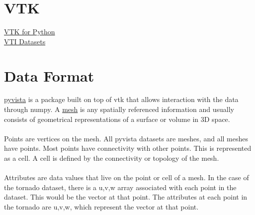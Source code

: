 \documentclass{article}
\begin{document}
\section*{VTK}
\href{https://kitware.github.io/vtk-examples/site/Python/}{VTK for Python}\\
\href{https://cgl.ethz.ch/research/visualization/data.php}{VTI Datasets}


\section*{Data Format}
\href{https://docs.pyvista.org/index.html}{pyvista} is a package built on top of vtk that allows interaction with the data through numpy. A \href{https://docs.pyvista.org/user-guide/what-is-a-mesh.html}{mesh} is any spatially referenced information and usually consists of geometrical representations of a surface or volume in 3D space.
\\\\
Points are vertices on the mesh. All pyvista datasets are meshes, and all meshes have points. Most points have connectivity with other points. This is represented as a cell. A cell is defined by the connectivity or topology of the mesh.
\\\\
Attributes are data values that live on the point or cell of a mesh. In the case of the tornado dataset, there is a u,v,w array associated with each point in the dataset. This would be the vector at that point. The attributes at each point in the tornado are u,v,w, which represent the vector at that point.



\end{document}

